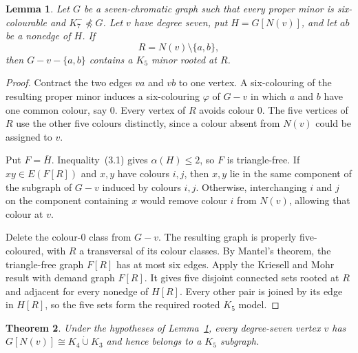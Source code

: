 \documentclass[11pt]{amsart}
\newtheorem{theorem}{Theorem}[section]
\newtheorem{lemma}[theorem]{Lemma}
\newcommand{\minor}{\preccurlyeq}
\newcommand{\N}{N}
\begin{document}
\begin{lemma}\label{lem:rooted-k5}
Let $G$ be a seven-chromatic graph such that every proper minor is
six-colourable and $K_7^{-}\not\minor G$.  Let $v$ have degree seven, put
$H=G[\N(v)]$, and let $ab$ be a nonedge of $H$.  If
\[
        R=\N(v)\setminus\{a,b\},
\]
then $G-v-\{a,b\}$ contains a $K_5$ minor rooted at $R$.
\end{lemma}

\begin{proof}
Contract the two edges $va$ and $vb$ to one vertex.  A six-colouring of
the resulting proper minor induces a six-colouring $\varphi$ of $G-v$ in
which $a$ and $b$ have one common colour, say $0$.  Every vertex of $R$
avoids colour $0$.  The five vertices of $R$ use the other five colours
distinctly, since a colour absent from $\N(v)$ could be assigned to $v$.

Put $F=\overline H$.  Inequality~(3.1) gives $\alpha(H)\leq2$, so $F$ is
triangle-free.  If $xy\in E(F[R])$ and $x,y$ have colours $i,j$, then
$x,y$ lie in the same component of the subgraph of $G-v$ induced by
colours $i,j$.  Otherwise, interchanging $i$ and $j$ on the component
containing $x$ would remove colour $i$ from $\N(v)$, allowing that colour
at $v$.

Delete the colour-$0$ class from $G-v$.  The resulting graph is properly
five-coloured, with $R$ a transversal of its colour classes.  By Mantel's
theorem, the triangle-free graph $F[R]$ has at most six edges.  Apply the
Kriesell and Mohr result with demand graph $F[R]$.  It gives five disjoint
connected sets rooted at $R$ and adjacent for every nonedge of $H[R]$.
Every other pair is joined by its edge in $H[R]$, so the five sets form the
required rooted $K_5$ model.
\end{proof}

\begin{theorem}\label{thm:local-classification}
Under the hypotheses of Lemma~\ref{lem:rooted-k5}, every degree-seven
vertex $v$ has $G[\N(v)]\cong K_4\mathbin{\dot\cup}K_3$ and hence
belongs to a $K_5$ subgraph.
\end{theorem}
\end{document}
